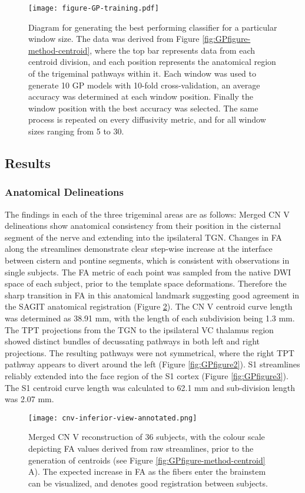 \begin{figure}[ht]
\centering
\texttt{[image: figure-GP-training.pdf]}
\caption{Diagram for generating the best performing classifier for a particular window size. The data was derived from Figure \ref{fig:GPfigure-method-centroid}, where the top bar represents data from each centroid division, and each position represents the anatomical region of the trigeminal pathways within it. Each window was used to generate 10 GP models with 10-fold cross-validation, an average accuracy was determined at each window position. Finally the window position with the best accuracy was selected. The same process is repeated on every diffusivity metric, and for all window sizes ranging from 5 to 30. }
\label{fig:GPfigure-gp-train}
\end{figure}

\subsection{Results}
\subsubsection{Anatomical Delineations}
The findings in each of the three trigeminal areas are as follows: Merged CN V delineations show anatomical consistency from their position in the cisternal segment of the nerve and extending into the ipsilateral TGN. Changes in FA along the streamlines demonstrate clear step-wise increase at the interface between cistern and pontine segments, which is consistent with observations in single subjects. The FA metric of each point was sampled from the native DWI space of each subject, prior to the template space deformations. Therefore the sharp transition in FA in this anatomical landmark suggesting good agreement in the SAGIT anatomical registration (Figure \ref{fig:GPfigure1}). The CN V centroid curve length was determined as 38.91 mm, with the length of each subdivision being 1.3 mm.
The TPT projections from the TGN to the ipsilateral VC thalamus region showed distinct bundles of decussating pathways in both left and right projections. The resulting pathways were not symmetrical, where the right TPT pathway appears to divert around the left (Figure \ref{fig:GPfigure2}).
S1 streamlines reliably extended into the face region of the S1 cortex (Figure \ref{fig:GPfigure3}). The S1 centroid curve length was calculated to 62.1 mm and sub-division length was 2.07 mm.

\begin{figure}[ht]
\centering
\texttt{[image: cnv-inferior-view-annotated.png]}
\caption{Merged CN V reconstruction of 36 subjects, with the colour scale depicting FA values derived from raw streamlines, prior to the generation of centroids (see Figure \ref{fig:GPfigure-method-centroid} A). The expected increase in FA as the fibers enter the brainstem can be visualized, and denotes good registration between subjects. }
\label{fig:GPfigure1}
\end{figure}

